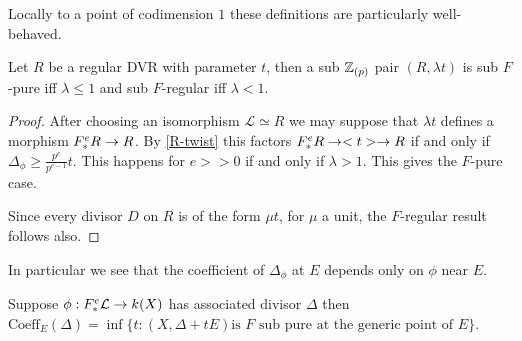 Locally to a point of codimension $1$ these definitions are particularly well-behaved.
\begin{lemma}
	Let $R$ be a regular DVR with parameter $t$, then a sub $\mathbb{Z}_{(p)}$ pair $(R,\lambda t)$ is sub $F$-pure iff $\lambda \leq 1$ and sub $F$-regular iff $\lambda < 1$.
\end{lemma}

\begin{proof}
	
	After choosing an isomorphism $\mathcal{L}\simeq R$ we may suppose that $\lambda t$ defines a morphism $F^{e}_{*} R \to R$. By \autoref{R-twist} this factors $F^{e}_{*} R \to <t> \to R$ if and only if $\Delta_{\phi} \geq \frac{p^{e}}{p^{e-1}}t$. This happens for $e>>0$ if and only if $\lambda > 1$. This gives the $F$-pure case.
	
	Since every divisor $D$ on $R$ is of the form $\mu t$, for $\mu$ a unit, the $F$-regular result follows also.
\end{proof}

%
In particular we see that the coefficient of $\Delta_{\phi}$ at $E$ depends only on $\phi$ near $E$.

\begin{corollary}\label{local}
	Suppose $\phi:F^{e}_{*}\mathcal{L} \to k(X)$ has associated divisor $\Delta$ then $\text{Coeff}_{E}(\Delta)=\inf\{t: (X,\Delta+tE) \text{is } F \text{ sub pure at the generic point of } E\}$. 
\end{corollary}

